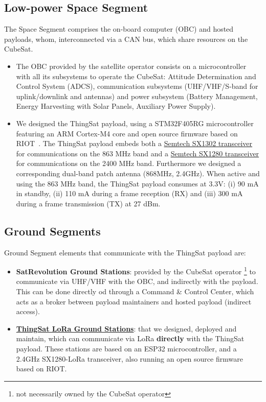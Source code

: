 \subsection*{Low-power Space Segment}
The Space Segment comprises the on-board computer (OBC) and hosted payloads, whom,
interconnected via a CAN bus, which share resources on the CubeSat.
\begin{itemize}
\item The OBC provided by the satellite operator consists on
a microcontroller with all its subsystems to operate the CubeSat:
Attitude Determination and Control System (ADCS),
communication subsystems (UHF/VHF/S-band for uplink/downlink and antennas) and
power subsystem (Battery Management, Energy Harvesting with Solar Panels, Auxiliary Power Supply).

\item We designed the ThingSat payload, using a STM32F405RG %
microcontroller featuring an ARM Cortex-M4 core
and open source firmware based on RIOT~\cite{baccelli2018riot}. The ThingSat payload embeds both a
\href{https://www.semtech.com/products/wireless-rf/lora-gateways/sx1302}{Semtech SX1302 transceiver} for
communications on the 863 MHz band and a \href{https://www.semtech.com/products/wireless-rf/24-ghz-transceivers/sx1280}{Semtech SX1280 transceiver}
for communications on the 2400 MHz band. Furthermore we designed a corresponding dual-band patch antenna (868MHz, 2.4GHz).
When active and using the 863 MHz band, the ThingSat payload consumes at 3.3V:
(i) 90 mA in standby,
(ii) 110 mA during a frame reception (RX) and
(iii) 300 mA during a frame transmission (TX) at 27 dBm.
\end{itemize}

\subsection*{Ground Segments}
Ground Segment elements that communicate with the ThingSat payload are:
\begin{itemize}
\item \textbf{SatRevolution Ground Stations}: provided by the CubeSat operator \footnote{not
necessarily owned by the CubeSat operator} to communicate via UHF/VHF with the OBC,
and indirectly with the payload. This can be done directly od through a Command \&
Control Center, which acts as a broker between payload maintainers and hosted payload
(indirect access).
\item \href{https://github.com/thingsat/tinygs_2g4station}{\textbf{ThingSat LoRa Ground Stations}}:
that we designed, deployed and maintain, which can communicate via LoRa \textbf{directly} with the
ThingSat payload. These stations are based on an ESP32 microcontroller, and a 2.4GHz SX1280-LoRa
transceiver, also running an open source firmware based on RIOT.
\end{itemize}

